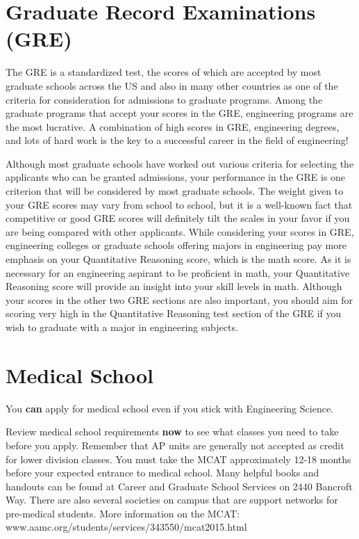 \section*{Graduate Record Examinations (GRE)}

The GRE is a standardized test, the scores of which are accepted by most graduate schools across the US and also in many other countries as one of the criteria for consideration for admissions to graduate programs. Among the graduate programs that accept your scores in the GRE, engineering programs are the most lucrative. A combination of high scores in GRE, engineering degrees, and lots of hard work is the key to a successful career in the field of engineering!

Although most graduate schools have worked out various criteria for selecting the applicants who can be granted admissions, your performance in the GRE is one criterion that will be considered by most graduate schools. The weight given to your GRE scores may vary from school to school, but it is a well-known fact that competitive or good GRE scores will definitely tilt the scales in your favor if you are being compared with other applicants. While considering your scores in GRE, engineering colleges or graduate schools offering majors in engineering pay more emphasis on your Quantitative Reasoning score, which is the math score. As it is necessary for an engineering aspirant to be proficient in math, your Quantitative Reasoning score will provide an insight into your skill levels in math. Although your scores in the other two GRE sections are also important, you should aim for scoring very high in the Quantitative Reasoning test section of the GRE if you wish to graduate with a major in engineering subjects.

\section*{Medical School}

You \textbf{can} apply for medical school even if you stick with Engineering Science.

Review medical school requirements \textbf{now} to see what classes you need to take before you apply. Remember that AP units are generally not accepted as credit for lower division classes.  You must take the MCAT approximately 12-18 months before your expected entrance to medical school. Many helpful books and handouts can be found at Career and Graduate School Services on 2440 Bancroft Way. There are also several societies on campus that are support networks for pre-medical students. More information on the MCAT: {\selectfont www.aamc.org/students/services/343550/mcat2015.html} 

